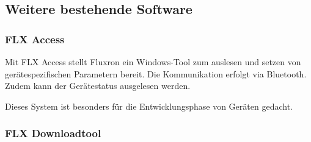 \subsection{Weitere bestehende Software}
\label{subsec:Weitere bestehende Software}
\subsubsection{FLX Access}
\label{subsubsec:FLX Access}
Mit FLX Access stellt Fluxron ein Windows-Tool zum auslesen und setzen von gerätespezifischen Parametern bereit. Die Kommunikation erfolgt via Bluetooth. Zudem kann der Gerätestatus ausgelesen werden. 

Dieses System ist besonders für die Entwicklungsphase von Geräten gedacht.
\subsubsection{FLX Downloadtool}
\label{subsubsec:FLX Downloadtool}


